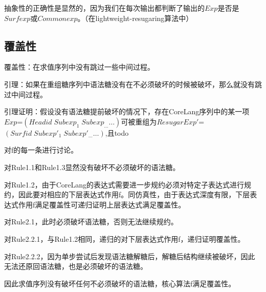 抽象性的正确性是显然的，因为我们在每次输出都判断了输出的$Exp$是否是$Surfexp$或$Commonexp$。（在lightweight-resugaring算法中）

\subsection{覆盖性}
覆盖性：在求值序列中没有跳过一些中间过程。

引理：如果在重组糖序列中语法糖没有在不必须破坏的时候被破坏，那么就没有跳过中间过程。

引理证明：假设没有语法糖提前破坏的情况下，存在CoreLang序列中的某一项$Exp$=$(Headid\;Subexp_{1}\;Subexp_{\ldots} \ldots)$可被重组为$ResugarExp'$=$(Surfid\;Subexp'_{1}\;Subexp'_{\ldots} \ldots)$,且todo

对f的每一条进行讨论。

对Rule1.1和Rule1.3显然没有破坏不必须破坏的语法糖。

对Rule1.2，由于CoreLang的表达式需要进一步规约必须对特定子表达式进行规约，因此要对相应的下层表达式作用f。同仿真性，由于表达式深度有限，下层表达式作用f满足覆盖性可递归证明上层表达式满足覆盖性。

对Rule2.1，此时必须破坏语法糖，否则无法继续规约。

对Rule2.2.1，与Rule1.2相同，递归的对下层表达式作用f，递归证明覆盖性。

对Rule2.2.2，因为单步尝试后发现语法糖解糖后，解糖后结构继续被破坏，因此无法还原回语法糖，也是必须破坏的语法糖。

因此求值序列没有破坏任何不必须破坏的语法糖，核心算法f满足覆盖性。


